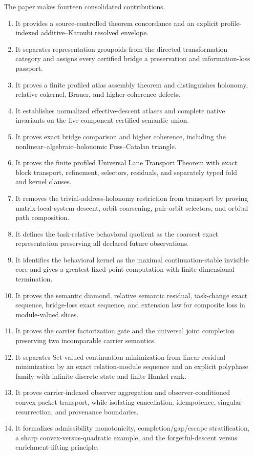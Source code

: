 \documentclass[11pt]{article}
\theoremstyle{definition}
\theoremstyle{remark}
\begin{document}
The paper makes fourteen consolidated contributions.
\begin{enumerate}
\item It provides a source-controlled theorem concordance and an explicit profile-indexed additive--Karoubi resolved envelope.
\item It separates representation groupoids from the directed transformation category and assigns every certified bridge a preservation and information-loss passport.
\item It proves a finite profiled atlas assembly theorem and distinguishes holonomy, relative cokernel, Brauer, and higher-coherence defects.
\item It establishes normalized effective-descent atlases and complete native invariants on the five-component certified semantic union.
\item It proves exact bridge comparison and higher coherence, including the nonlinear--algebraic--holonomic Fuss--Catalan triangle.
\item It proves the finite profiled Universal Lane Transport Theorem with exact block transport, refinement, selectors, residuals, and separately typed fold and kernel clauses.
\item It removes the trivial-address-holonomy restriction from transport by proving matrix-local-system descent, orbit coarsening, pair-orbit selectors, and orbital path composition.
\item It defines the task-relative behavioral quotient as the coarsest exact representation preserving all declared future observations.
\item It identifies the behavioral kernel as the maximal continuation-stable invisible core and gives a greatest-fixed-point computation with finite-dimensional termination.
\item It proves the semantic diamond, relative semantic residual, task-change exact sequence, bridge-loss exact sequence, and extension law for composite loss in module-valued slices.
\item It proves the carrier factorization gate and the universal joint completion preserving two incomparable carrier semantics.
\item It separates Set-valued continuation minimization from linear residual minimization by an exact relation-module sequence and an explicit polyphase family with infinite discrete state and finite Hankel rank.
\item It proves carrier-indexed observer aggregation and observer-conditioned convex packet transport, while isolating cancellation, idempotence, singular-resurrection, and provenance boundaries.
\item It formalizes admissibility monotonicity, completion/gap/escape stratification, a sharp convex-versus-quadratic example, and the forgetful-descent versus enrichment-lifting principle.
\end{enumerate}
\end{document}
